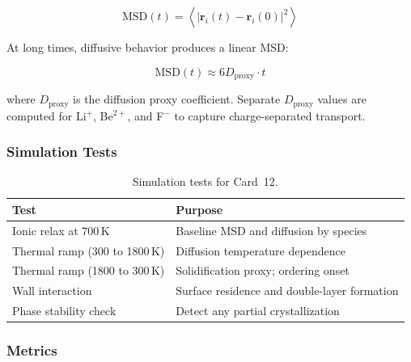 \documentclass[12pt]{article}
\begin{document}
\begin{equation}
	\mathrm{MSD}(t) = \left\langle \left| \mathbf{r}_i(t) - \mathbf{r}_i(0) \right|^2 \right\rangle
	\label{eq:flibe_msd}
\end{equation}

\noindent At long times, diffusive behavior produces a linear MSD:

\begin{equation}
	\mathrm{MSD}(t) \approx 6 D_{\mathrm{proxy}} \cdot t
	\label{eq:flibe_diffusion}
\end{equation}

\noindent where $D_{\mathrm{proxy}}$ is the diffusion proxy coefficient.
Separate $D_{\mathrm{proxy}}$ values are computed for Li$^+$, Be$^{2+}$,
and F$^-$ to capture charge-separated transport.

\subsubsection*{Simulation Tests}

\begin{table}[H]
\centering
\caption{Simulation tests for Card~12.}
\label{tab:flibe_tests}
\begin{tabular}{ll}
\toprule
\textbf{Test} & \textbf{Purpose} \\
\midrule
Ionic relax at 700\,K          & Baseline MSD and diffusion by species \\
Thermal ramp (300 to 1800\,K)  & Diffusion temperature dependence \\
Thermal ramp (1800 to 300\,K)  & Solidification proxy; ordering onset \\
Wall interaction               & Surface residence and double-layer formation \\
Phase stability check          & Detect any partial crystallization \\
\bottomrule
\end{tabular}
\end{table}

\subsubsection*{Metrics}
\end{document}
